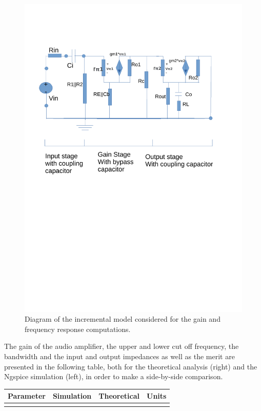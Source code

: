 \begin{figure}[h] \centering
\includegraphics[width=0.95\linewidth]{incremental_t4.pdf}
\vspace{-7cm}
\caption{Diagram of the incremental model considered for the gain and frequency response computations.}
\label{fig:diagram_t4}
\end{figure}
\par
\vspace{1cm}


The gain of the audio amplifier, the upper and lower cut off frequency, the bandwidth and the input and output impedances as well as the merit are presented in the following table, both for the theoretical analysis (right) and the Ngspice simulation (left), in order to make a side-by-side comparison.\par


\hfill
 \parbox{1\linewidth}{
  \centering
  \begin{tabular}{|l|l|l|r|}
    \hline    
    {\bf Parameter} & {\bf Simulation} & {\bf Theoretical } & {\bf Units }\\ \hline
    
  \label{tab:results}
  \end{tabular}
  }
  

